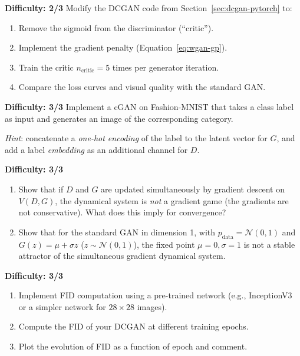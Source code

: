\begin{exercise}
\label{exo:wgan-gp-impl}
\textbf{Difficulty: 2/3}
Modify the DCGAN code from Section~\ref{sec:dcgan-pytorch} to:
\begin{enumerate}
    \item Remove the sigmoid from the discriminator (``critic'').
    \item Implement the gradient penalty (Equation~\eqref{eq:wgan-gp}).
    \item Train the critic $n_{\text{critic}}=5$ times per generator iteration.
    \item Compare the loss curves and visual quality with the standard GAN.
\end{enumerate}
\end{exercise}

\begin{exercise}
\label{exo:cgan-impl}
\textbf{Difficulty: 3/3}
Implement a cGAN on Fashion-MNIST that takes a class label as input and generates an image of the corresponding category.

\emph{Hint}: concatenate a \emph{one-hot encoding} of the label to the latent vector for $G$, and add a label \emph{embedding} as an additional channel for $D$.
\end{exercise}

\begin{exercise}
\label{exo:gan-convergence}
\textbf{Difficulty: 3/3}
\begin{enumerate}
    \item Show that if $D$ and $G$ are updated simultaneously by gradient descent on $V(D, G)$, the dynamical system is \emph{not} a gradient game (the gradients are not conservative). What does this imply for convergence?
    \item Show that for the standard GAN in dimension 1, with $p_{\text{data}} = \mathcal{N}(0, 1)$ and $G(z) = \mu + \sigma z$ ($z \sim \mathcal{N}(0,1)$), the fixed point $\mu=0, \sigma=1$ is not a stable attractor of the simultaneous gradient dynamical system.
\end{enumerate}
\end{exercise}

\begin{exercise}
\label{exo:fid-compute}
\textbf{Difficulty: 3/3}
\begin{enumerate}
    \item Implement FID computation using a pre-trained network (e.g., InceptionV3 or a simpler network for $28 \times 28$ images).
    \item Compute the FID of your DCGAN at different training epochs.
    \item Plot the evolution of FID as a function of epoch and comment.
\end{enumerate}
\end{exercise}
